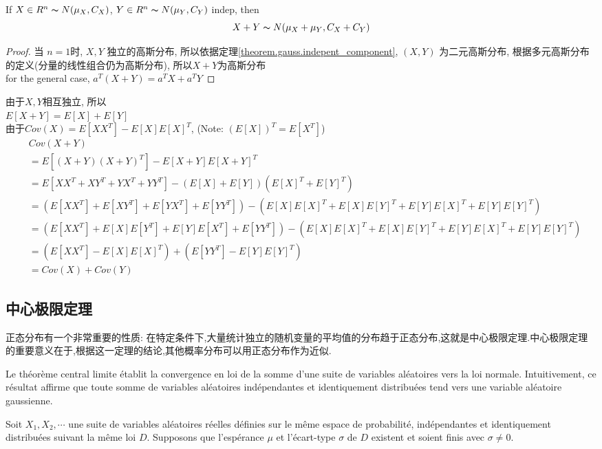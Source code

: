 \documentclass{article}
\begin{document}
\begin{theorem}
If $X \in R^n \thicksim{N}(\mu_X, C_X)$, $Y \in R^n \thicksim{N}(\mu_Y, C_Y)$
indep, then
$$X + Y \thicksim{N}(\mu_X + \mu_Y, C_X + C_Y)$$
\end{theorem}
\begin{proof}
当 $n=1$时, $X, Y$ 独立的高斯分布, 所以依据定理\ref{theorem.gauss.indepent_component}, $(X, Y)$ 为二元高斯分布, 根据多元高斯分布的定义(分量的线性组合仍为高斯分布), 所以$X+Y$为高斯分布\\
for the general case, $a^T (X+Y) = a^T X + a^T Y$
\end{proof}
由于$X,Y$相互独立, 所以\\
$E[X+Y] = E[X] + E[Y]$\\
由于$Cov(X) = E[XX^T] - E[X] E[X]^T$, (Note: $(E[X])^T = E[X^T]$)
$$
\begin{aligned}
& Cov(X+Y) \\
& = E[(X+Y)(X+Y)^T] - E[X+Y] E[X+Y]^T \\
& = E[X X^T + X Y^T + Y X^T + Y Y^T] - (E[X] + E[Y]) (E[X]^T+ E[Y]^T) \\
& = (E[X X^T] + E[X Y^T] + E[Y X^T] + E[Y Y^T]) - (E[X] E[X]^T + E[X] E[Y]^T + E[Y] E[X]^T + E[Y] E[Y]^T) \\
& = (E[X X^T] + E[X] E[Y^T] + E[Y] E[X^T] + E[Y Y^T]) - (E[X] E[X]^T + E[X] E[Y]^T + E[Y] E[X]^T + E[Y] E[Y]^T) \\
& = (E[X X^T] - E[X] E[X]^T) +  (E[Y Y^T] - E[Y] E[Y]^T) \\
& = Cov(X) + Cov(Y)
\end{aligned}
$$
\subsection{中心极限定理}
正态分布有一个非常重要的性质:
在特定条件下,大量统计独立的随机变量的平均值的分布趋于正态分布,这就是中心极限定理.中心极限定理的重要意义在于,根据这一定理的结论,其他概率分布可以用正态分布作为近似.

Le th\'eor\`eme central limite \'etablit la convergence en loi de la somme d'une suite de variables al\'eatoires vers la loi normale.
Intuitivement, ce r\'esultat affirme que toute somme de variables al\'eatoires ind\'ependantes et identiquement distribu\'ees tend vers
une variable al\'eatoire gaussienne.

Soit $X_1, X_2, \cdots$ une suite de variables al\'eatoires r\'eelles d\'efinies sur le m\^eme espace de probabilit\'e, ind\'ependantes et identiquement distribu\'ees suivant la m\^eme loi $D$. Supposons que l'esp\'erance $\mu$ et l'\'ecart-type $\sigma$ de $D$ existent et soient finis avec $\sigma \neq 0$.
\end{document}
